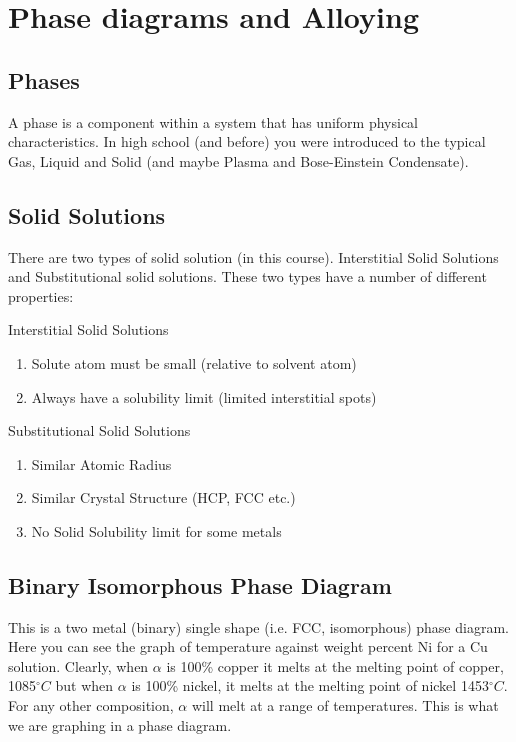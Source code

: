 \documentclass[12pt]{article}
\begin{document}
\section{Phase diagrams and Alloying}
\subsection{Phases}
A phase is a component within a system that has uniform physical characteristics. 
In high school (and before) you were introduced to the typical Gas, Liquid and Solid (and maybe Plasma and Bose-Einstein Condensate).

\subsection{Solid Solutions}
There are two types of solid solution (in this course). 
Interstitial Solid Solutions and Substitutional solid solutions.
These two types have a number of different properties:

Interstitial Solid Solutions 
\begin{enumerate}
  \item Solute atom must be small (relative to solvent atom)
  \item Always have a solubility limit (limited interstitial spots)
\end{enumerate}

Substitutional Solid Solutions
\begin{enumerate}
  \item Similar Atomic Radius 
  \item Similar Crystal Structure (HCP, FCC etc.) 
  \item No Solid Solubility limit for some metals
\end{enumerate}

\subsection{Binary Isomorphous Phase Diagram}
This is a two metal (binary) single shape (i.e. FCC, isomorphous) phase diagram.
Here you can see the graph of temperature against weight percent Ni for a Cu solution.
Clearly, when $\alpha$ is 100\% copper it melts at the melting point of copper, 1085$^\circ C$ but when $\alpha$ is 100\% nickel, it melts at the melting point of nickel 1453$^\circ C$.
For any other composition, $\alpha$ will melt at a range of temperatures.
This is what we are graphing in a phase diagram.
\end{document}
